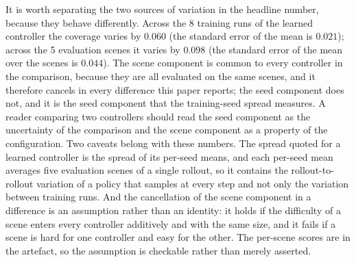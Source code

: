 \documentclass[conference]{IEEEtran}
\begin{document}
It is worth separating the two sources of variation in the headline
number, because they behave differently.  Across the 8
training runs of the learned controller the coverage varies by $0.060$
(the standard error of the mean is $0.021$); across the
5 evaluation scenes it varies by $0.098$ (the
standard error of the mean over the scenes is $0.044$).  The
scene component is common to every controller in the comparison, because
they are all evaluated on the same scenes, and it therefore cancels in
every difference this paper reports; the seed component does not, and it
is the seed component that the training-seed spread measures.  A reader
comparing two controllers should read the seed component as the
uncertainty of the comparison and the scene component as a property of the
configuration.  Two caveats belong with these numbers.  The spread
quoted for a learned controller is the spread of its per-seed means,
and each per-seed mean averages five evaluation scenes of a single
rollout, so it contains the rollout-to-rollout variation of a policy
that samples at every step and not only the variation between training
runs.  And the cancellation of the scene component in a difference is an
assumption rather than an identity: it holds if the difficulty of a
scene enters every controller additively and with the same size, and
it fails if a scene is hard for one controller and easy for the other.
The per-scene scores are in the artefact, so the assumption is
checkable rather than merely asserted.
\end{document}

